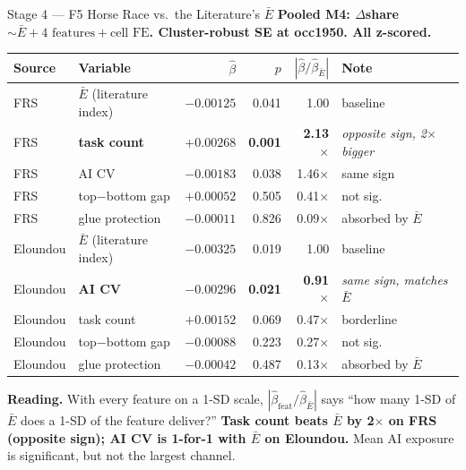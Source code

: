 \documentclass[10pt,english,aspectratio=169]{beamer}
\begin{document}
\begin{frame}{Stage 4 --- F5 Horse Race vs.\ the Literature's $\bar E$}
\scriptsize\centering
\textbf{Pooled M4: $\Delta$share $\sim \bar E + 4\text{ features} + \text{cell FE}$. Cluster-robust SE at occ1950. All z-scored.}

\vspace{0.15cm}
\begin{tabular}{l l r r r l}
\toprule
\textbf{Source} & \textbf{Variable} & $\hat\beta$ & $p$ & $|\hat\beta/\hat\beta_{\bar E}|$ & \textbf{Note} \\
\midrule
FRS & $\bar E$ (literature index) & $-0.00125$ & 0.041 & 1.00 & baseline \\
FRS & \textbf{task count} & $+0.00268$ & \textbf{0.001} & \textbf{2.13$\times$} & \emph{opposite sign, 2$\times$ bigger} \\
FRS & AI CV & $-0.00183$ & 0.038 & 1.46$\times$ & same sign \\
FRS & top$-$bottom gap & $+0.00052$ & 0.505 & 0.41$\times$ & not sig. \\
FRS & glue protection & $-0.00011$ & 0.826 & 0.09$\times$ & absorbed by $\bar E$ \\
\midrule
Eloundou & $\bar E$ (literature index) & $-0.00325$ & 0.019 & 1.00 & baseline \\
Eloundou & \textbf{AI CV} & $-0.00296$ & \textbf{0.021} & \textbf{0.91$\times$} & \emph{same sign, matches $\bar E$} \\
Eloundou & task count & $+0.00152$ & 0.069 & 0.47$\times$ & borderline \\
Eloundou & top$-$bottom gap & $-0.00088$ & 0.223 & 0.27$\times$ & not sig. \\
Eloundou & glue protection & $-0.00042$ & 0.487 & 0.13$\times$ & absorbed by $\bar E$ \\
\bottomrule
\end{tabular}

\vspace{0.25cm}
\begin{tcolorbox}[colback=blue!3,colframe=RedTitle!60]\scriptsize
\textbf{Reading.} With every feature on a 1-SD scale, $|\hat\beta_{\text{feat}}/\hat\beta_{\bar E}|$ says ``how many 1-SD of $\bar E$ does a 1-SD of the feature deliver?'' \textbf{Task count beats $\bar E$ by 2$\times$ on FRS (opposite sign); AI CV is 1-for-1 with $\bar E$ on Eloundou.} Mean AI exposure is significant, but not the largest channel.
\end{tcolorbox}
\end{frame}
\end{document}
